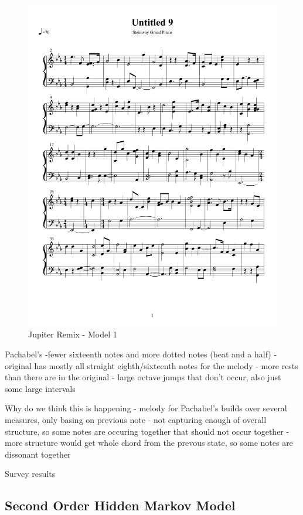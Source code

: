 \documentclass{article} %
\begin{document}
\begin{figure}[H]
\centering
\caption{Jupiter Remix - Model 1}
\includegraphics [scale = 0.6] {JupiterRemix-cropped.pdf}
\end{figure}

Pachabel's
-fewer sixteenth notes and more dotted notes (beat and a half)
- original has mostly all straight eighth/sixteenth notes for the melody
- more rests than there are in the original 
- large octave jumps that don't occur, also just some large intervals


Why do we think this is happening
- melody for Pachabel's builds over several measures, only basing on previous note
- not capturing enough of overall structure, so some notes are occuring together that should not occur together
- more structure would get whole chord from the prevous state, so some notes are dissonant together

Survey results

\subsection{Second Order Hidden Markov Model}
\end{document}
